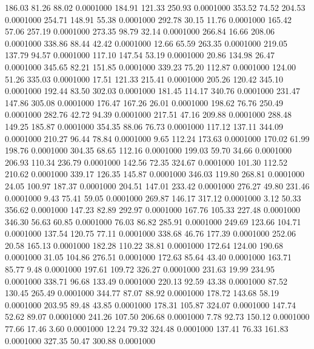  186.03   81.26   88.02   0.0001000
 184.91  121.33  250.93   0.0001000
 353.52   74.52  204.53   0.0001000
 254.71  148.91   55.38   0.0001000
 292.78   30.15   11.76   0.0001000
 165.42   57.06  257.19   0.0001000
 273.35   98.79   32.14   0.0001000
 266.84   16.66  208.06   0.0001000
 338.86   88.44   42.42   0.0001000
  12.66   65.59  263.35   0.0001000
 219.05  137.79   94.57   0.0001000
 117.10  147.54   53.19   0.0001000
  20.86  134.98   26.47   0.0001000
 345.65   82.21  151.85   0.0001000
 339.23   75.20  112.87   0.0001000
 124.00   51.26  335.03   0.0001000
  17.51  121.33  215.41   0.0001000
 205.26  120.42  345.10   0.0001000
 192.44   83.50  302.03   0.0001000
 181.45  114.17  340.76   0.0001000
 231.47  147.86  305.08   0.0001000
 176.47  167.26   26.01   0.0001000
 198.62   76.76  250.49   0.0001000
 282.76   42.72   94.39   0.0001000
 217.51   47.16  209.88   0.0001000
 288.48  149.25  185.87   0.0001000
 354.35   88.06   76.73   0.0001000
 117.12  137.11  344.09   0.0001000
 210.27   96.44   78.84   0.0001000
   9.65  112.24  173.63   0.0001000
 170.02   61.99  198.76   0.0001000
 304.35   68.65  112.16   0.0001000
 199.03   59.70   34.66   0.0001000
 206.93  110.34  236.79   0.0001000
 142.56   72.35  324.67   0.0001000
 101.30  112.52  210.62   0.0001000
 339.17  126.35  145.87   0.0001000
 346.03  119.80  268.81   0.0001000
  24.05  100.97  187.37   0.0001000
 204.51  147.01  233.42   0.0001000
 276.27   49.80  231.46   0.0001000
   9.43   75.41   59.05   0.0001000
 269.87  146.17  317.12   0.0001000
   3.12   50.33  356.62   0.0001000
 147.23   82.89  292.97   0.0001000
 167.76  105.33  227.48   0.0001000
 346.30   56.63   60.85   0.0001000
  76.03   86.82  285.91   0.0001000
 249.69  123.66  104.71   0.0001000
 137.54  120.75   77.11   0.0001000
 338.68   46.76  177.39   0.0001000
 252.06   20.58  165.13   0.0001000
 182.28  110.22   38.81   0.0001000
 172.64  124.00  190.68   0.0001000
  31.05  104.86  276.51   0.0001000
 172.63   85.64   43.40   0.0001000
 163.71   85.77    9.48   0.0001000
 197.61  109.72  326.27   0.0001000
 231.63   19.99  234.95   0.0001000
 338.71   96.68  133.49   0.0001000
 220.13   92.59   43.38   0.0001000
  87.52  130.45  265.49   0.0001000
 344.77   87.07   88.92   0.0001000
 178.72  143.68   58.19   0.0001000
 203.95   89.48   43.85   0.0001000
 178.31  105.87  324.07   0.0001000
 147.74   52.62   89.07   0.0001000
 241.26  107.50  206.68   0.0001000
   7.78   92.73  150.12   0.0001000
  77.66   17.46    3.60   0.0001000
  12.24   79.32  324.48   0.0001000
 137.41   76.33  161.83   0.0001000
 327.35   50.47  300.88   0.0001000
